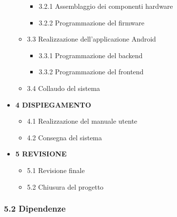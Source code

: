 \documentclass[]{article}
\providecommand{\tightlist}{%
  \setlength{\itemsep}{0pt}\setlength{\parskip}{0pt}}
\begin{document}
\begin{itemize}
\begin{itemize}
    \begin{itemize}
    \tightlist
    \item
      3.2.1 Assemblaggio dei componenti hardware
    \item
      3.2.2 Programmazione del firmware
    \end{itemize}
  \item
    3.3 Realizzazione dell'applicazione Android

    \begin{itemize}
    \tightlist
    \item
      3.3.1 Programmazione del backend
    \item
      3.3.2 Programmazione del frontend
    \end{itemize}
  \item
    3.4 Collaudo del sistema
  \end{itemize}
\item
  \textbf{4 DISPIEGAMENTO}

  \begin{itemize}
  \tightlist
  \item
    4.1 Realizzazione del manuale utente
  \item
    4.2 Consegna del sistema
  \end{itemize}
\item
  \textbf{5 REVISIONE}

  \begin{itemize}
  \tightlist
  \item
    5.1 Revisione finale
  \item
    5.2 Chiusura del progetto
  \end{itemize}
\end{itemize}

\hypertarget{dipendenze}{%
\subsubsection{5.2 Dipendenze}\label{dipendenze}}
\end{document}

